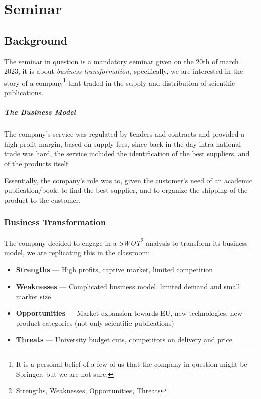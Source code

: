 \documentclass[openright, twoside, twocolumn, a4paper, 10pt]{report}
\begin{document}
\chapter{Seminar}

\section{Background}

The seminar in question is a mandatory seminar given on the 20th of march 2023, it is about \emph{business transformation},
specifically, we are interested in the story of a company\footnote{
	It is a personal belief of a few of us that the company in question might be Springer, but we are not sure.
} that traded in the supply and distribution of scientific publications.

\paragraph{The Business Model}

The company's service was regulated by tenders and contracts and provided a high profit margin, based on supply fees, since back in the
day intra-national trade was hard, the service included the identification of the best suppliers, and of the
products itself.

Essentially, the company's role was to, given the customer's need of an academic publication/book, to find the best supplier, and to
organize the shipping of the product to the customer.

\subsection{Business Transformation}

The company decided to engage in a \emph{SWOT}\footnote{
	Strengths, Weaknesses, Opportunities, Threats
} analysis to transform its business model, we are replicating this in the classroom:

\begin{itemize}
	\item \textbf{Strengths} ---  High profits, captive market, limited competition
	\item \textbf{Weaknesses} --- Complicated business model, limited demand and small market size
	\item \textbf{Opportunities} --- Market expansion towards EU, new technologies, new product categories (not only scientific publications)
	\item \textbf{Threats} --- University budget cuts, competitors on delivery and price
\end{itemize}
\end{document}
